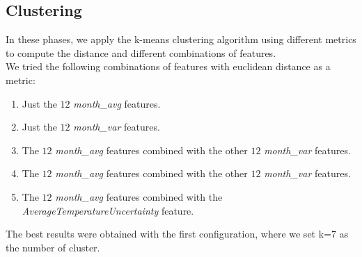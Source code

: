 \subsection{Clustering}
In these phases, we apply the k-means clustering algorithm using different metrics to compute the distance and different combinations of features.\\
We tried the following combinations of features with euclidean distance as a metric:
\begin{enumerate}
    \item Just the $12$ \textit{month\_avg} features.
    \item Just the $12$ \textit{month\_var} features.
    \item The $12$ \textit{month\_avg} features combined with the other $12$ \textit{month\_var} features.
    \item The $12$ \textit{month\_avg} features combined with the other $12$ \textit{month\_var} features.
    \item The $12$ \textit{month\_avg} features combined with the \textit{AverageTemperatureUncertainty} feature.
\end{enumerate}
The best results were obtained with the first configuration, where we set k=7 as the number of cluster.\\
